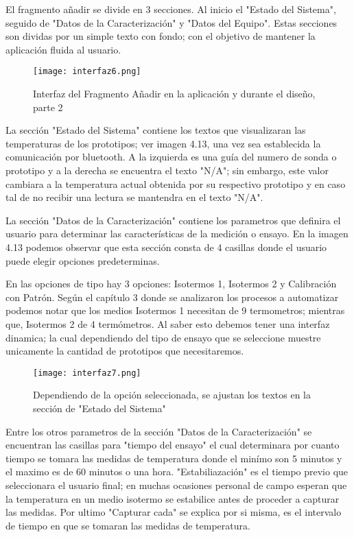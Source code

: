 \par \noindent
El fragmento añadir se divide en 3 secciones. Al inicio el "Estado del Sistema", seguido de  "Datos de la Caracterización" y "Datos del Equipo". Estas secciones son dividas por un simple texto con fondo; con el objetivo de mantener la aplicación fluida al usuario.

\begin{figure}[H]
	\centering
	\texttt{[image: interfaz6.png]}
	\caption{Interfaz del Fragmento Añadir en la aplicación y durante el diseño, parte 2}
\end{figure}

\par \noindent
La sección "Estado del Sistema" contiene los textos que visualizaran las temperaturas de los prototipos; ver imagen 4.13, una vez sea establecida la comunicación por bluetooth. A la izquierda es una guía del numero de sonda o prototipo y a la derecha se encuentra el texto "N/A"; sin embargo, este valor cambiara a la temperatura actual obtenida por su respectivo prototipo y en caso tal de no recibir una lectura se mantendra en el texto "N/A".

\par \noindent
La sección "Datos de la Caracterización" contiene los parametros que definira el usuario para determinar las características de la medición o ensayo. En la imagen 4.13 podemos observar que esta sección consta de 4 casillas donde el usuario puede elegir opciones predeterminas.

\par \noindent
En las opciones de tipo hay 3 opciones: Isotermos 1, Isotermos 2 y Calibración con Patrón. Según el capítulo 3 donde se analizaron los procesos a automatizar podemos notar que los medios Isotermos 1 necesitan de 9 termometros; mientras que, Isotermos 2 de 4 termómetros. Al saber esto debemos tener una interfaz dinamica; la cual dependiendo del tipo de ensayo que se seleccione muestre unicamente la cantidad de prototipos que necesitaremos. 

\begin{figure}[H]
	\centering
	\texttt{[image: interfaz7.png]}
	\caption{Dependiendo de la opción seleccionada, se ajustan los textos en la sección de "Estado del Sistema"}
\end{figure}

\par \noindent
Entre los otros parametros de la sección "Datos de la Caracterización" se encuentran las casillas para "tiempo del ensayo" el cual determinara por cuanto tiempo se tomara las medidas de temperatura donde el minímo son 5 minutos y el maximo es de 60 minutos o una hora. "Estabiliazación" es el tiempo previo que seleccionara el usuario final; en muchas ocasiones personal de campo esperan que la temperatura en un medio isotermo se estabilice antes de proceder a capturar las medidas. Por ultimo "Capturar cada" se explica por si misma, es el intervalo de tiempo en que se tomaran las medidas de temperatura.


